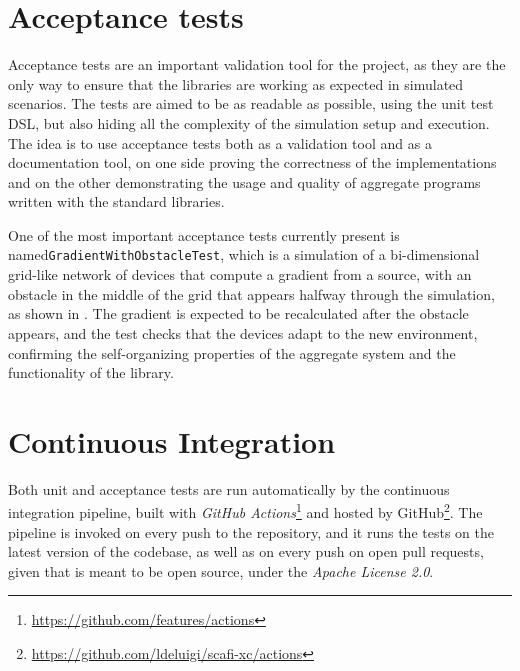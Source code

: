 \section{Acceptance tests}

Acceptance tests are an important validation tool for the project, as they are the only way to ensure that the libraries are working as expected in simulated scenarios.
%
The tests are aimed to be as readable as possible, using the unit test \ac{DSL}, but also hiding all the complexity of the simulation setup and execution.
%
The idea is to use acceptance tests both as a validation tool and as a documentation tool, on one side proving the correctness of the implementations and on the other demonstrating the usage and quality of aggregate programs written with the standard libraries.

One of the most important acceptance tests currently present is named\linebreak\texttt{GradientWithObstacleTest}, which is a simulation of a bi-dimensional grid-like network of devices that compute a gradient from a source, with an obstacle in the middle of the grid that appears halfway through the simulation, as shown in .
%
The gradient is expected to be recalculated after the obstacle appears, and the test checks that the devices adapt to the new environment, confirming the self-organizing properties of the aggregate system and the functionality of the library.



\section{Continuous Integration} \label{chap:evaluation->sec:continuous-integration}

Both unit and acceptance tests are run automatically by the continuous integration pipeline, built with \textit{GitHub Actions}\footnote{\url{https://github.com/features/actions}} and hosted by GitHub\footnote{\url{https://github.com/ldeluigi/scafi-xc/actions}}.
%
The pipeline is invoked on every push to the repository, and it runs the tests on the latest version of the codebase, as well as on every push on open pull requests, given that \this is meant to be open source, under the \textit{Apache License 2.0}.


